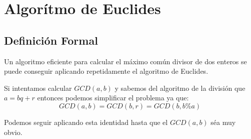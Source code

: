 \documentclass[12pt, fleqn]{report}                             %
\begin{document}
    \clearpage
    \section{Algorítmo de Euclides}

        \subsection*{Definición Formal}

            Un algoritmo eficiente para calcular el máximo común divisor de dos enteros
            se puede conseguir aplicando repetidamente el algoritmo de Euclides.

            Si intentamos calcular $GCD(a,b)$ y sabemos del algoritmo de la división 
            que $a=bq+r$ entonces podemos simplificar el problema ya que:
            \begin{equation}
                GCD(a,b) = GCD(b,r) = GCD(b, b\%a)
            \end{equation}

            Podemos seguir aplicando esta identidad hasta que el $GCD(a, b)$ séa muy
            obvio.
\end{document}
